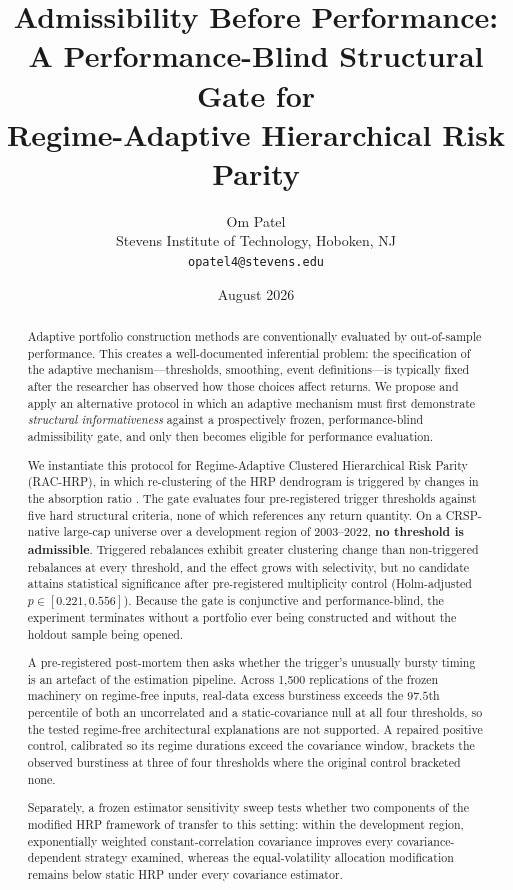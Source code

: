\documentclass[12pt,letterpaper]{article}
\title{\bfseries Admissibility Before Performance:\\
A Performance-Blind Structural Gate for\\
Regime-Adaptive Hierarchical Risk Parity}
\author{Om Patel\\[2pt]
\small Stevens Institute of Technology, Hoboken, NJ\\
\small \texttt{opatel4@stevens.edu}}
\date{August 2026}
\begin{document}
\maketitle

\begin{abstract}
\noindent Adaptive portfolio construction methods are conventionally evaluated by
out-of-sample performance. This creates a well-documented inferential problem: the
specification of the adaptive mechanism---thresholds, smoothing, event
definitions---is typically fixed after the researcher has observed how those
choices affect returns. We propose and apply an alternative protocol in which an
adaptive mechanism must first demonstrate \emph{structural informativeness} against
a prospectively frozen, performance-blind admissibility gate, and only then becomes
eligible for performance evaluation.

We instantiate this protocol for Regime-Adaptive Clustered Hierarchical Risk Parity
(RAC-HRP), in which re-clustering of the HRP dendrogram is triggered by changes in
the absorption ratio \citep{kritzman2011}. The gate evaluates four pre-registered
trigger thresholds against five hard structural criteria, none of which references
any return quantity. On a CRSP-native large-cap universe over a development region
of 2003--2022, \textbf{no threshold is admissible}. Triggered rebalances exhibit
greater clustering change than non-triggered rebalances at every threshold, and the
effect grows with selectivity, but no candidate attains statistical significance
after pre-registered multiplicity control (Holm-adjusted $p \in [0.221, 0.556]$).
Because the gate is conjunctive and performance-blind, the experiment terminates
without a portfolio ever being constructed and without the holdout sample being
opened.

A pre-registered post-mortem then asks whether the trigger's unusually bursty
timing is an artefact of the estimation pipeline. Across 1{,}500 replications of the
frozen machinery on regime-free inputs, real-data excess burstiness exceeds the
$97.5$th percentile of both an uncorrelated and a static-covariance null at all four
thresholds, so the tested regime-free architectural explanations are not supported. A
repaired positive control, calibrated so its regime durations exceed the covariance window,
brackets the observed burstiness at three of four thresholds where the original control
bracketed none.

Separately, a frozen estimator sensitivity sweep tests whether two components of
the modified HRP framework of \citet{molyboga2020} transfer to this setting: within the
development region, exponentially
weighted constant-correlation covariance improves every covariance-dependent
strategy examined, whereas the equal-volatility allocation modification remains
below static HRP under every covariance estimator.


\end{abstract}
\end{document}
